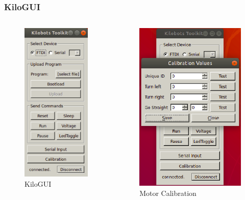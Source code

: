 \begin{frame}
	\frametitle{KiloGUI}
	\begin{columns}[b]
	\begin{column}{0.5\textwidth}
		\begin{figure}
			\centering
			\includegraphics[scale=0.35]{images/kilogui.png}
			\vspace{0.2cm}
			\caption{KiloGUI}
		\end{figure}
	\end{column}
	\begin{column}{0.5\textwidth}	
		\begin{figure}
			\includegraphics[scale=0.35]{images/kilogui-motor-calib.png}
			\vspace{0.2cm}
			\caption{Motor Calibration}
		\end{figure}
	\end{column}
\end{columns}
\end{frame}

